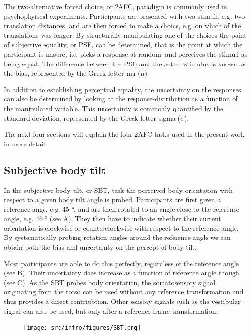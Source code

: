 The two-alternative forced choice, or 2AFC, paradigm is commonly used in psychophyiscal experiments. Participants are presented with two stimuli, e.g. two translation distances, and are then forced to make a choice, e.g. on which of the translations was longer. By structurally manipulating one of the choices the point of subjective equality, or PSE, can be determined, that is the point at which the participant is unsure, i.e. picks a response at random, and perceives the stimuli as being equal. The difference between the PSE and the actual stimulus is known as the bias, represented by the Greek letter mu ($\mu$).

In addition to establishing perceptual equality, the uncertainty on the responses can also be determined by looking at the response-distribution as a function of the manipulated variable. This uncertainty is commonly quantified by the standard deviation, represented by the Greek letter sigma ($\sigma$).

The next four sections will explain the four 2AFC tasks used in the present work in more detail.

\subsection{Subjective body tilt}
In the subjective body tilt, or SBT, task the perceived body orientation with respect to a given body tilt angle is probed. Participants are first given a reference ange, e.g. 45 \si{\degree}, and are then rotated to an angle close to the reference angle, e.g. 46 \si{\degree} (see A). They then have to indicate whether their current orientation is clockwise or counterclockwise with respect to the reference angle. By systematically probing rotation angles around the reference angle we can obtain both the bias and uncertainty on the percept of body tilt.

Most participants are able to do this perfectly, regardless of the reference angle (see B). Their uncertainty does increase as a function of reference angle though (see C).
As the SBT probes body orientation, the somatosensory signal originating from the torso can be used without any reference transformation and thus provides a direct contriubtion. Other sensory signals such as the vestibular signal can also be used, but only after a reference frame transformation.

\begin{figure}
    \texttt{[image: src/intro/figures/SBT.png]}

    \caption{}
    \label{intro:fig4}
\end{figure}


